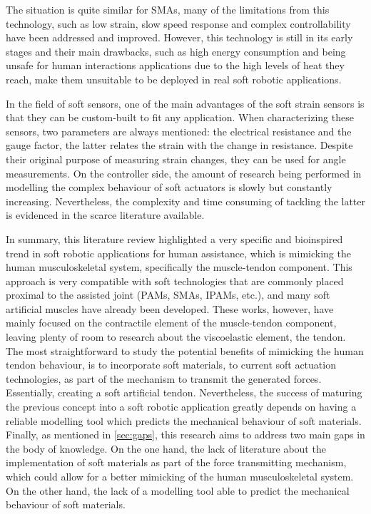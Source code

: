 The situation is quite similar for SMAs, many of the limitations from this technology, such as low strain, slow speed response and complex controllability have been addressed and improved. However, this technology is still in its early stages and their main drawbacks, such as high energy consumption and being unsafe for human interactions applications due to the high levels of heat they reach, make them unsuitable to be deployed in real soft robotic applications.

In the field of soft sensors, one of the main advantages of the soft strain sensors is that they can be custom-built to fit any application. When characterizing these sensors, two parameters are always mentioned: the electrical resistance and the gauge factor, the latter relates the strain with the change in resistance. Despite their original purpose of measuring strain changes, they can be used for angle measurements. On the controller side, the amount of research being performed in modelling the complex behaviour of soft actuators is slowly but constantly increasing. Nevertheless, the complexity and time consuming of tackling the latter is evidenced in the scarce literature available.

In summary, this literature review highlighted a very specific and bioinspired trend in soft robotic applications for human assistance, which is mimicking the human musculoskeletal system, specifically the muscle-tendon component. This approach is very compatible with soft technologies that are commonly placed proximal to the assisted joint (PAMs, SMAs, IPAMs, etc.), and many soft artificial muscles have already been developed. These works, however, have mainly focused on the contractile element of the muscle-tendon component, leaving plenty of room to research about the viscoelastic element, the tendon. The most straightforward to study the potential benefits of mimicking the human tendon behaviour, is to incorporate soft materials, to current soft actuation technologies, as part of the mechanism to transmit the generated forces. Essentially, creating a soft artificial tendon. Nevertheless, the success of maturing the previous concept into a soft robotic application greatly depends on having a reliable modelling tool which predicts the mechanical behaviour of soft materials. Finally, as mentioned in \autoref{sec:gaps}, this research aims to address two main gaps in the body of knowledge. On the one hand, the lack of literature about the implementation of soft materials as part of the force transmitting mechanism, which could allow for a better mimicking of the human musculoskeletal system. On the other hand, the lack of a modelling tool able to predict the mechanical behaviour of soft materials.
